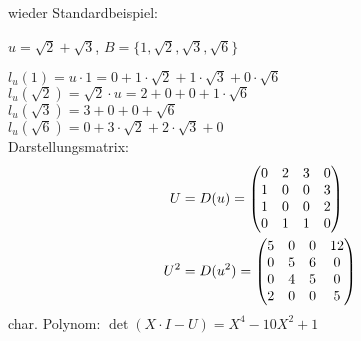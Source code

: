 \example wieder Standardbeispiel:{
  $u=\sqrt{2}+\sqrt{3}$, $B=\{1,\sqrt{2},\sqrt{3},\sqrt{6}\}$

  $l_u(1)=u\cdot 1=0+1\cdot\sqrt{2}+1\cdot\sqrt{3}+0\cdot\sqrt{6}$\\
  $l_u(\sqrt{2})=\sqrt{2}\cdot u=2+0+0+1\cdot\sqrt{6}$\\
  $l_u(\sqrt{3})=3+0+0+\sqrt{6}$\\
  $l_u(\sqrt{6})=0+3\cdot\sqrt{2}+2\cdot\sqrt{3}+0$\\
  Darstellungsmatrix: 
  \begin{align*}
    U&=D(u)=
    \begin{pmatrix}
      0&2&3&0\\
      1&0&0&3\\
      1&0&0&2\\
      0&1&1&0\\
      \end{pmatrix}\\
    U^2&=D(u^2)=
    \begin{pmatrix}
      5&0&0&12\\
      0&5&6&0\\
      0&4&5&0\\
      2&0&0&5\\
      \end{pmatrix}
  \end{align*}
  char. Polynom: $\operatorname{det}(X\cdot I-U)=X^4-10X^2+1$
  }
